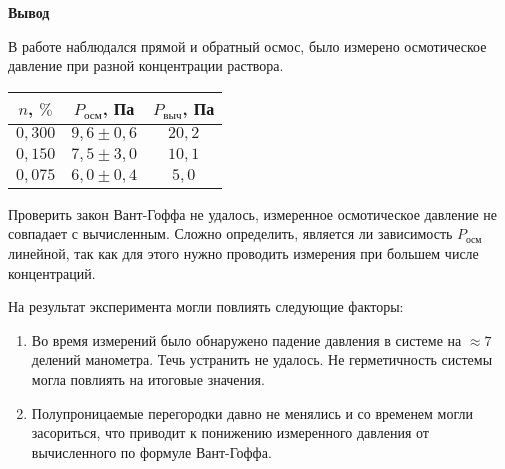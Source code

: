 \textbf{\Large Вывод}

В работе наблюдался прямой и обратный осмос, было измерено осмотическое давление при разной концентрации раствора.

\begin{tabular}{|c|c|c|}
	\hline
	$n$, $\%$ & $P_{осм}$, Па & $P_{выч}$, Па \\
	\hline
	$0,300$ & $9,6 \pm 0,6$  & $20,2$ \\
	$0,150$ & $7,5 \pm 3,0$  & $10,1$ \\
 	$0,075$ & $6,0 \pm 0,4$  & $5,0$  \\
	\hline
\end{tabular}

Проверить закон Вант-Гоффа не удалось, измеренное осмотическое давление не совпадает с вычисленным. Сложно определить, является ли зависимость $P_{осм}$ линейной, так как для этого нужно проводить измерения при большем числе концентраций.

На результат эксперимента могли повлиять следующие факторы:

\begin{enumerate}
	\item Во время измерений было обнаружено падение давления в системе на $\approx 7$ делений манометра. Течь устранить не удалось. Не герметичность системы могла повлиять на итоговые значения.
	\item Полупроницаемые перегородки давно не менялись и со временем могли засориться, что приводит к понижению измеренного давления от вычисленного по формуле Вант-Гоффа.
\end{enumerate}